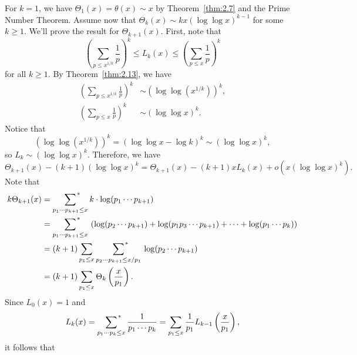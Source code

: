 \begin{pf}
    For $k = 1$, we have $\Theta_1(x) = \theta(x) \sim x$ by Theorem~\ref{thm:2.7}
    and the Prime Number Theorem. Assume now that $\Theta_k(x) 
    \sim kx(\log \log x)^{k-1}$ for some $k \geq 1$. We'll prove the result for 
    $\Theta_{k+1}(x)$. First, note that 
    \[ \left( \sum_{p \leq x^{1/k}} \frac{1}{p} \right)^{\!k} 
    \leq L_k(x) \leq \left( \sum_{p \leq x} \frac{1}{p}\right)^{\!k} \] 
    for all $k \geq 1$. By Theorem~\ref{thm:2.13}, we have 
    \begin{align*} 
        \left( \sum_{p \leq x^{1/k}} \frac{1}{p} \right)^{\!k} &\sim 
        \left(\log \log (x^{1/k})\right)^k, \\ 
        \left( \sum_{p \leq x} \frac{1}{p}\right)^{\!k} &\sim 
        (\log \log x)^k. 
    \end{align*}
    Notice that 
    \[ \left( \log\log(x^{1/k}) \right)^{\!k} = 
    (\log\log x - \log k)^k \sim (\log\log x)^{k}, \] 
    so $L_k \sim (\log\log x)^k$. Therefore, we have 
    \[ \Theta_{k+1}(x) - (k+1)(\log\log x)^k = \Theta_{k+1}(x) 
    - (k+1)xL_k(x) + o\left( x(\log\log x)^k \right). \] 
    Note that 
    \begin{align*} 
        k\Theta_{k+1}(x) &= \sum_{p_1\cdots p_{k+1} \leq x}
        {\vphantom{\sum}}^{\hspace{-3.5ex}*} \hspace{2.5ex}
        k \cdot \log(p_1 \cdots p_{k+1}) \\ 
        &= \sum_{p_1\cdots p_{k+1} \leq x}
        {\vphantom{\sum}}^{\hspace{-3.5ex}*} \hspace{2.5ex}
        \left( \log(p_2 \cdots p_{k+1}) + \log(p_1p_3 \cdots p_{k+1}) 
        + \cdots + \log(p_1 \cdots p_k) \right) \\ 
        &= (k+1) \sum_{p_1 \leq x} \sum_{p_2\cdots p_{k+1} \leq x/p_1}
        {\vphantom{\sum}}^{\hspace{-5ex}*} \hspace{4ex} 
        \log(p_2 \cdots p_{k+1}) \\ 
        &= (k+1) \sum_{p_1 \leq x} \Theta_k \left( \frac{x}{p_1} \right). 
    \end{align*}
    Since $L_0(x) = 1$ and 
    \[ L_k(x) = \sum_{p_1\cdots p_k \leq x}
    {\vphantom{\sum}}^{\hspace{-2.5ex}*} \hspace{1.5ex} 
    \frac{1}{p_1 \cdots p_k} = \sum_{p_1 \leq x} \frac{1}{p_1} L_{k-1} 
    \left( \frac{x}{p_1} \right), \] 
    it follows that 
    \begin{align*}

\end{align*}
\end{pf}
